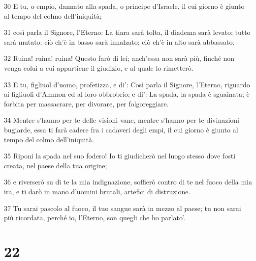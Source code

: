 \par 30 E tu, o empio, dannato alla spada, o principe d'Israele, il cui giorno è giunto al tempo del colmo dell'iniquità;
\par 31 così parla il Signore, l'Eterno: La tiara sarà tolta, il diadema sarà levato; tutto sarà mutato; ciò ch'è in basso sarà innalzato; ciò ch'è in alto sarà abbassato.
\par 32 Ruina! ruina! ruina! Questo farò di lei; anch'essa non sarà più, finché non venga colui a cui appartiene il giudizio, e al quale lo rimetterò.
\par 33 E tu, figliuol d'uomo, profetizza, e di': Così parla il Signore, l'Eterno, riguardo ai figliuoli d'Ammon ed al loro obbrobrio; e di': La spada, la spada è sguainata; è forbita per massacrare, per divorare, per folgoreggiare.
\par 34 Mentre s'hanno per te delle visioni vane, mentre s'hanno per te divinazioni bugiarde, essa ti farà cadere fra i cadaveri degli empi, il cui giorno è giunto al tempo del colmo dell'iniquità.
\par 35 Riponi la spada nel suo fodero! Io ti giudicherò nel luogo stesso dove fosti creata, nel paese della tua origine;
\par 36 e riverserò su di te la mia indignazione, soffierò contro di te nel fuoco della mia ira, e ti darò in mano d'uomini brutali, artefici di distruzione.
\par 37 Tu sarai pascolo al fuoco, il tuo sangue sarà in mezzo al paese; tu non sarai più ricordata, perché io, l'Eterno, son quegli che ho parlato'.

\chapter{22}

